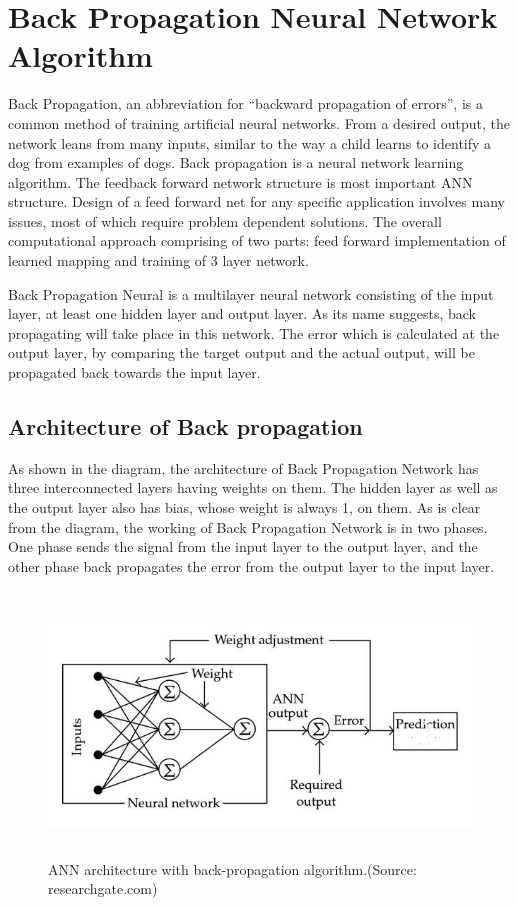 \section{Back Propagation Neural Network Algorithm}
Back Propagation, an abbreviation for “backward propagation of errors”, is a common method of training artificial neural networks. From a desired output, the network leans from many inputs, similar to the way a child learns to identify a dog from examples of dogs. Back propagation is a neural network learning algorithm. The feedback forward network structure is most important ANN structure. Design of a feed forward net for any specific application involves many issues, most of which require problem dependent solutions. The overall computational approach comprising of two parts: feed forward implementation of learned mapping and training of 3 layer network.\par
Back Propagation Neural is a multilayer neural network consisting of the input layer, at least one hidden layer and output layer. As its name suggests, back propagating will take place in this network. The error which is calculated at the output layer, by comparing the target output and the actual output, will be propagated back towards the input layer.
 

\subsection{Architecture of Back propagation}
As shown in the diagram, the architecture of Back Propagation Network has three interconnected layers having weights on them. The hidden layer as well as the output layer also has bias, whose weight is always 1, on them. As is clear from the diagram, the working of Back Propagation Network is in two phases. One phase sends the signal from the input layer to the output layer, and the other phase back propagates the error from the output layer to the input layer.

  \begin{figure}[h]
  \begin{center}
  \includegraphics[width=120mm,height=70mm]{images/ANNBack.jpg}
  \caption{ANN architecture with back-propagation algorithm.(Source: researchgate.com)}
  \end{center}
  \end{figure}  
   
